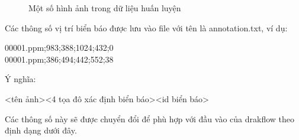 \begin{figure}[H]
\caption{Một số hình ảnh trong dữ liệu huấn luyện}
\end{figure}
Các thông số vị trí biển báo được lưu vào file với tên là annotation.txt, ví dụ:
\begin{center}
00001.ppm;983;388;1024;432;0\\
00001.ppm;386;494;442;552;38
\end{center}
\hspace{5mm} Ý nghĩa:
\begin{center}
<tên ảnh><4 tọa đô xác định biển báo><id biển báo>
\end{center}
Các thông số này sẽ được chuyển đổi để phù hợp với đầu vào của drakflow theo định dạng dưới đây.
